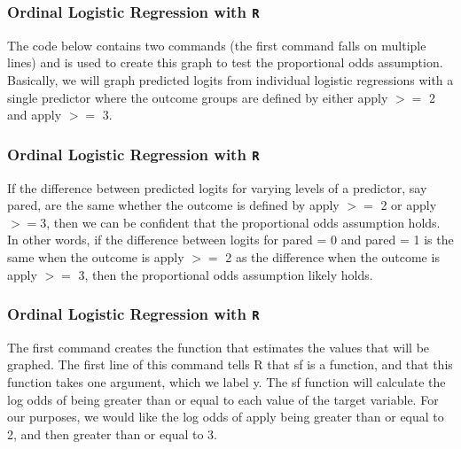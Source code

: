 \documentclass[00-GLMregslides.tex]{subfiles}
\begin{document}
\begin{frame}[fragile]

\frametitle{Ordinal Logistic Regression with \texttt{R}}
\Large
The code below contains two commands (the first command falls on multiple lines) and is used to create this graph to test the proportional odds assumption. Basically, we will graph predicted logits from individual logistic regressions with a single predictor where the outcome groups are defined by either apply $>=$ 2 and apply $>=$ 3. 

\end{frame}
\begin{frame}[fragile]

\frametitle{Ordinal Logistic Regression with \texttt{R}}
\Large

If the difference between predicted logits for varying levels of a predictor, say pared, are the same whether the outcome is defined by apply $>=$ 2 or apply $>=$3, then we can be confident that the proportional odds assumption holds. In other words, if the difference between logits for pared = 0 and pared = 1 is the same when the outcome is apply $>=$ 2 as the difference when the outcome is apply $>=$ 3, then the proportional odds assumption likely holds.

\end{frame}
\begin{frame}[fragile]

\frametitle{Ordinal Logistic Regression with \texttt{R}}
\Large
The first command creates the function that estimates the values that will be graphed. The first line of this command tells R that sf is a function, and that this function takes one argument, which we label y. The sf function will calculate the log odds of being greater than or equal to each value of the target variable. For our purposes, we would like the log odds of apply being greater than or equal to 2, and then greater than or equal to 3. 

\end{frame}
\end{document}
